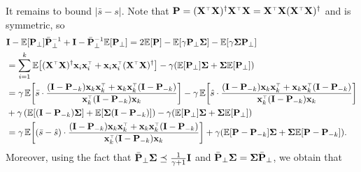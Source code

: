 \documentclass[thesis.tex]{subfiles}
\begin{document}
It remains to bound $|\bar s - s|$. Note that $\P=(\X^\top\X)^\dagger\X^\top\X = \X^\top\X
(\X^\top\X)^\dagger$ and is symmetric, so
\begin{align*}
  &\I - \E[\P_\perp]\bar\P_\perp^{-1} + \I - \bar\P_\perp^{-1} \E[\P_\perp]
  = 2\E[\P] - \E[\gamma\P_\perp\Sigmab] - \E[\gamma\Sigmab\P_\perp]\\
  &= \sum_{i=1}^k\E\big[(\X^\top\X)^\dagger\x_i\x_i^\top + \x_i\x_i^\top (\X^\top\X)^\dagger \big] - \gamma (\E[\P_\perp]\Sigmab + \Sigmab \E[\P_\perp])\\
  &=\gamma\,
    \E\bigg[\bar s\cdot\frac{(\I-\P_{-k})\x_k\x_k^\top + \x_k\x_k^\top (\I-\P_{-k})} {\x_k^\top(\I - \P_{-k}) \x_k}\bigg]
    -\gamma\,\E\bigg[\hat s
    \cdot\frac{(\I-\P_{-k})\x_k\x_k^\top + \x_k\x_k^\top (\I-\P_{-k})}{\x_k^\top(\I-\P_{-k})\x_k}\bigg] \\ 
  & +\gamma\,(\E[(\I - \P_{-k})\Sigmab] + \E[\Sigmab ( \I -\P_{-k}) ])- \gamma (\E[\P_\perp]\Sigmab + \Sigmab \E[\P_\perp]) \\
  &=\gamma\,\E\bigg[(\bar s - \hat s)
    \cdot\frac{(\I-\P_{-k})\x_k\x_k^\top + \x_k\x_k^\top (\I-\P_{-k})}{\x_k^\top(\I-\P_{-k})\x_k}\bigg]
+    \gamma (\E[\P-\P_{-k}]\Sigmab + \Sigmab \E[\P-\P_{-k}]). 
\end{align*}
Moreover, using the fact that $\bar{\mathbf P}_\perp\mathbf{\Sigma}\preceq\frac1{\gamma+1}\mathbf I$ and $\bar {\mathbf P}_\perp \mathbf{\Sigma} = \mathbf{\Sigma} \bar {\mathbf P}_\perp$, we obtain that
\end{document}
